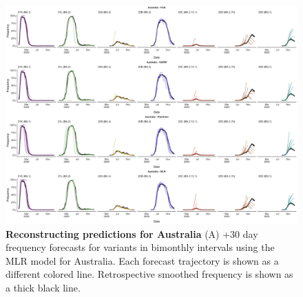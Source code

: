 
\begin{figure}[th!]
	\centering
	\includegraphics[width=0.9\textwidth=0.01]{supp_figures/supplementary_fig_Australia.png}
	\caption[\textbf{Reconstructing predictions for Australia}]{
		\textbf{Reconstructing predictions for Australia}
		(A) +30 day frequency forecasts for variants in bimonthly intervals using the MLR model for Australia.
		Each forecast trajectory is shown as a different colored line.
		Retrospective smoothed frequency is shown as a thick black line.
	}
	\label{fig:S2}
\end{figure}



